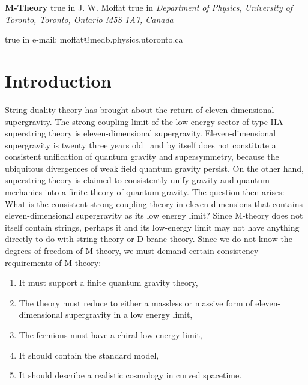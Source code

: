 \documentclass[a4paper,12pt]{article}
\begin{document}
\begin{center}
{\large\bf M-Theory}
 true in
{\large J. W. Moffat}
 true in
{\it Department of Physics, University of Toronto,
Toronto, Ontario M5S 1A7, Canada}
\end{center}
\begin{abstract}%
We construct an eleven-dimensional superspace with superspace coordinates
and formulate a finite M-theory using non-anticommutative geometry. The
conjectured M-theory has the correct eleven-dimensional supergravity low
energy limit. We consider the problem of finding a stable finite M-theory
which has de Sitter space as a natural ground state, and the problem of
eliminating possible future horizons.
\end{abstract}
 true in
e-mail: moffat@medb.physics.utoronto.ca


\section{Introduction}

String duality theory has brought about the return of eleven-dimensional
supergravity. The strong-coupling limit of the low-energy sector of type
IIA superstring theory is eleven-dimensional supergravity.
Eleven-dimensional supergravity is twenty three years old~\cite{Julia} and
by itself does not constitute a consistent unification of quantum gravity
and supersymmetry, because the ubiquitous divergences of weak field quantum
gravity persist. On the other hand, superstring theory is claimed to
consistently unify gravity and quantum mechanics into a finite theory of
quantum gravity. The question then arises: What is the consistent strong
coupling theory in eleven dimensions that contains eleven-dimensional
supergravity as its low energy limit? Since M-theory does not itself
contain strings, perhaps it and its low-energy limit may not have
anything directly to do with string theory or D-brane theory. Since we do
not know the degrees of freedom of M-theory, we must demand certain
consistency requirements of M-theory:

\begin{enumerate}
\item It must support a finite quantum gravity theory,

\item The theory must reduce to either a massless or
massive form of eleven-dimensional supergravity in a low energy limit,

\item The fermions must have a chiral low energy limit,

\item It should contain the standard model,

\item It should describe a realistic cosmology in curved
spacetime.
\end{enumerate}
\end{document}

